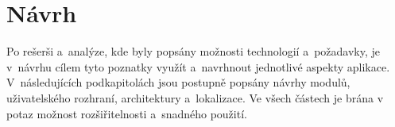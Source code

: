\chapter{Návrh}
\label{chap:design}

Po rešerši a~analýze,
kde byly popsány možnosti technologií a~požadavky,
je v~návrhu cílem tyto poznatky využít a~navrhnout jednotlivé aspekty aplikace.
V~následujících podkapitolách jsou postupně popsány návrhy modulů,
uživatelského rozhraní, architektury a~lokalizace.
Ve všech částech je brána v potaz možnost rozšiřitelnosti a~snadného použití.   





